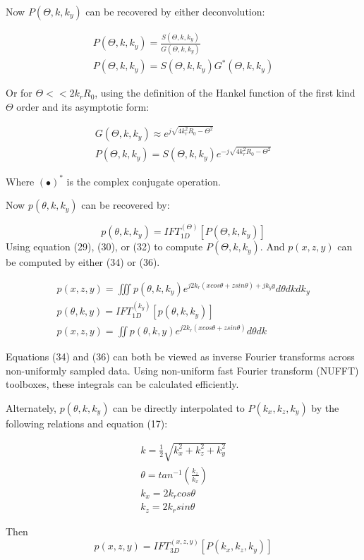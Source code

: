 \documentclass{IEEEtran}
\begin{document}
Now $P(\Theta,k,k_y)$ can be recovered by either deconvolution:

\begin{gather}
	P(\Theta,k,k_y) = \frac{S(\Theta,k,k_y)}{G(\Theta,k,k_y)} \\
	P(\Theta,k,k_y) = S(\Theta,k,k_y)G^*(\Theta,k,k_y)
\end{gather}

Or for $\Theta <<2k_rR_0$, using the definition of the Hankel function of the first kind $\Theta$ order and its asymptotic form:

\begin{gather}
	G(\Theta,k,k_y) \approx e^{j\sqrt{4k_r^2R_0-\Theta^2}} \\
	P(\Theta,k,k_y) = S(\Theta,k,k_y)e^{-j\sqrt{4k_r^2R_0-\Theta^2}}
\end{gather}

Where $(\bullet)^*$ is the complex conjugate operation.

Now $p(\theta,k,k_y)$ can be recovered by:

\begin{equation}
	p(\theta,k,k_y) = IFT_{1D}^{(\Theta)}[P(\Theta,k,k_y)]
\end{equation}
Using equation (29), (30), or (32) to compute $P(\Theta,k,k_y)$.
And $p(x,z,y)$ can be computed by either (34) or (36).

\begin{gather}
	p(x,z,y) = \iiint p(\theta,k,k_y) e^{j2k_r(xcos\theta+zsin\theta) + jk_y y}d\theta dk dk_y \\
	p(\theta,k,y) = IFT_{1D}^{(k_y)}[p(\theta,k,k_y)] \\
	p(x,z,y) = \iint p(\theta,k,y) e^{j2k_r(xcos\theta+zsin\theta)} d\theta dk
\end{gather}

Equations (34) and (36) can both be viewed as inverse Fourier transforms across non-uniformly sampled data. Using non-uniform fast Fourier transform (NUFFT) toolboxes, these integrals can be calculated efficiently.

Alternately, $p(\theta,k,k_y)$ can be directly interpolated to $P(k_x,k_z,k_y)$ by the following relations and equation (17):

\begin{gather}
	k = \frac{1}{2} \sqrt{k_x^2 + k_z^2 + k_y^2} \\
	\theta = tan^{-1}\left(\frac{k_z}{k_x}\right) \\
	k_x = 2k_r cos\theta \\
	k_z = 2k_r sin\theta
\end{gather}

Then
\begin{equation}
	p(x,z,y) = IFT_{3D}^{(x,z,y)}[P(k_x,k_z,k_y)]
\end{equation}
\end{document}
